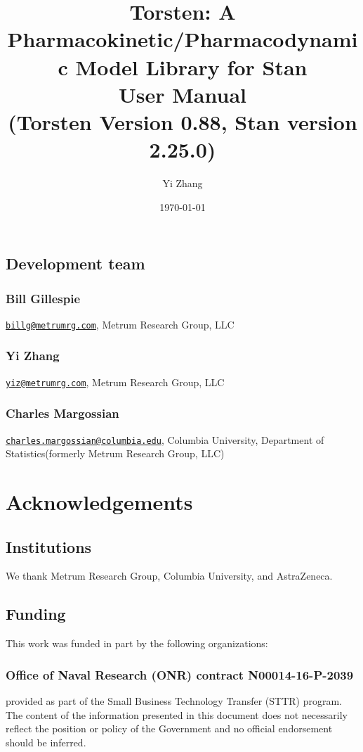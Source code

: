 \documentclass[11pt, reqno, oneside]{amsbook}
\author{Yi Zhang}
\date{\today}
\title{Torsten: A Pharmacokinetic/Pharmacodynamic Model Library for Stan\\\medskip
\large User Manual \\  (Torsten Version 0.88, Stan version 2.25.0)}
\numberwithin{equation}{chapter}
\numberwithin{figure}{chapter}
\numberwithin{table}{chapter}
\theoremstyle{remark}
\begin{document}
\maketitle
\tableofcontents


\section*{Development team}
\label{sec:orgd45490a}
\subsection*{Bill Gillespie}
\label{sec:org48dd960}
\href{mailto:billg@metrumrg.com}{\texttt{billg@metrumrg.com}},
Metrum Research Group, LLC
\subsection*{Yi Zhang}
\label{sec:org8872338}
\href{mailto:yiz@metrumrg.com}{\texttt{yiz@metrumrg.com}}, Metrum Research Group, LLC
\subsection*{Charles Margossian}
\label{sec:org5924b74}
\href{mailto:charles.margossian@columbia.edu}{\texttt{charles.margossian@columbia.edu}}, Columbia University, Department of Statistics(formerly Metrum Research Group, LLC)

\chapter*{Acknowledgements}
\label{sec:org2d891c4}
\section*{Institutions}
\label{sec:orgd4ff47f}
We thank Metrum Research Group, Columbia University, and AstraZeneca.
\section*{Funding}
\label{sec:org2fce20b}
This work was funded in part by the following organizations:
\subsection*{Office of Naval Research (ONR) contract N00014-16-P-2039}
\label{sec:orge724ed1}
provided as part of the Small Business Technology Transfer (STTR)
program. The content of the information presented in this document
does not necessarily reflect the position or policy of the
Government and no official endorsement should be inferred.
\end{document}
